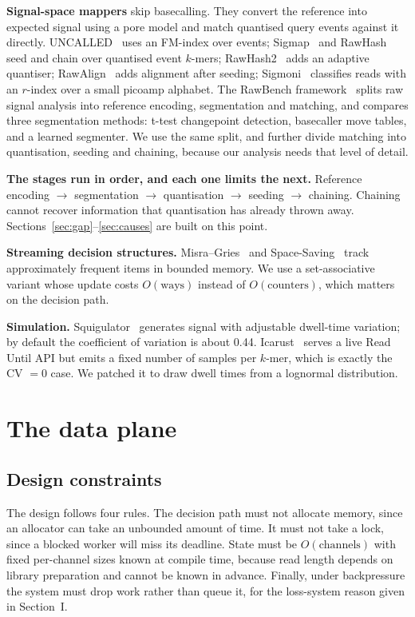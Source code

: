 \documentclass[conference]{IEEEtran}
\begin{document}
\textbf{Signal-space mappers} skip basecalling. They convert the reference into expected signal
using a pore model and match quantised query events against it directly. UNCALLED~\cite{uncalled}
uses an FM-index over events; Sigmap~\cite{sigmap} and RawHash~\cite{rawhash} seed and chain
over quantised event $k$-mers; RawHash2~\cite{rawhash2} adds an adaptive quantiser;
RawAlign~\cite{rawalign} adds alignment after seeding; Sigmoni~\cite{sigmoni} classifies reads
with an $r$-index over a small picoamp alphabet. The RawBench framework~\cite{rawbench} splits
raw signal analysis into reference encoding, segmentation and matching, and compares three
segmentation methods: t-test changepoint detection, basecaller move tables, and a learned
segmenter. We use the same split, and further divide matching into quantisation, seeding and
chaining, because our analysis needs that level of detail.

\textbf{The stages run in order, and each one limits the next.} Reference encoding
$\rightarrow$ segmentation $\rightarrow$ quantisation $\rightarrow$ seeding $\rightarrow$
chaining. Chaining cannot recover information that quantisation has already thrown away.
Sections~\ref{sec:gap}--\ref{sec:causes} are built on this point.

\textbf{Streaming decision structures.} Misra--Gries~\cite{misragries} and
Space-Saving~\cite{spacesaving} track approximately frequent items in bounded memory. We use a
set-associative variant whose update costs $O(\text{ways})$ instead of $O(\text{counters})$,
which matters on the decision path.

\textbf{Simulation.} Squigulator~\cite{squigulator} generates signal with adjustable dwell-time
variation; by default the coefficient of variation is about 0.44. Icarust~\cite{icarust} serves a
live Read Until API but emits a fixed number of samples per $k$-mer, which is exactly the CV $= 0$
case. We patched it to draw dwell times from a lognormal distribution.

\section{The data plane}
\label{sec:plane}

\subsection{Design constraints}

The design follows four rules. The decision path must not allocate memory, since an allocator
can take an unbounded amount of time. It must not take a lock, since a blocked worker will miss
its deadline. State must be $O(\text{channels})$ with fixed per-channel sizes known at compile
time, because read length depends on library preparation and cannot be known in advance.
Finally, under backpressure the system must drop work rather than queue it, for the loss-system
reason given in Section~I.
\end{document}
